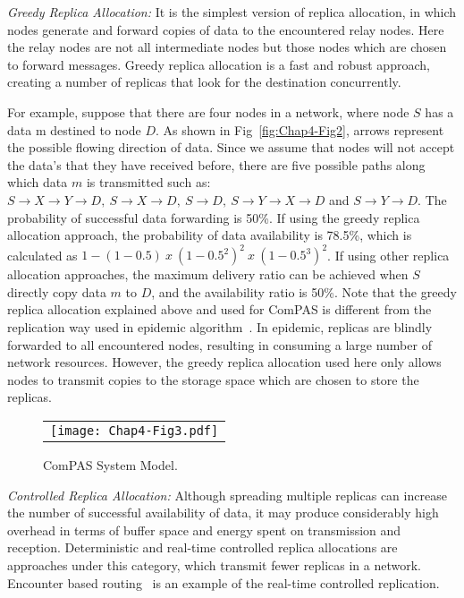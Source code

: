 \emph{Greedy Replica Allocation:} It is the simplest version of replica allocation, in which nodes generate and forward copies of data to the encountered relay nodes. Here the relay nodes are not all intermediate nodes but those nodes which are chosen to forward messages. Greedy replica allocation is a fast and robust approach, creating a number of replicas that look for the destination concurrently.

For example, suppose that there are four nodes in a network, where node $S$ has a data m destined to node $D$. As shown in Fig~\ref{fig:Chap4-Fig2}, arrows represent the possible flowing direction of data. Since we assume that nodes will not accept the data's that they have received before, there are five possible paths along which data $m$ is transmitted such as:
$S\rightarrow X\rightarrow Y\rightarrow D,~S\rightarrow X\rightarrow D,~S\rightarrow D,~S\rightarrow Y\rightarrow X\rightarrow D$ and $S\rightarrow Y\rightarrow D$.
The probability of successful data forwarding is 50\%. If using the greedy replica allocation approach, the probability of data availability is 78.5\%, which is calculated as $1-(1-0.5)~x~(1-0.5^2)^2~x~(1-0.5^3)^2$. If using other replica allocation approaches, the maximum delivery ratio can be achieved when $S$ directly copy data $m$ to $D$, and the availability ratio is 50\%.
Note that the greedy replica allocation explained above and used for ComPAS is different from the replication way used in epidemic algorithm~\cite{AVahdat2000}. In epidemic, replicas are blindly forwarded to all encountered nodes, resulting in consuming a large number of network resources. However, the greedy replica allocation used here only allows nodes to transmit copies to the storage space which are chosen to store the replicas.
\begin{figure}[h]
\begin{center}
  \begin{tabular}{c}
  \texttt{[image: Chap4-Fig3.pdf]}
  \end{tabular}
  \caption{ComPAS System Model.}
  \label{fig:Chap4-Fig3}
\end{center}
\end{figure}

\emph{Controlled Replica Allocation:} Although spreading multiple replicas can increase the number of successful availability of data, it may produce considerably high overhead in terms of buffer space and energy spent on transmission and reception. Deterministic and real-time controlled replica allocations are approaches under this category, which transmit fewer replicas in a network. Encounter based routing~\cite{SCNelson2009} is an example of the real-time controlled replication.

